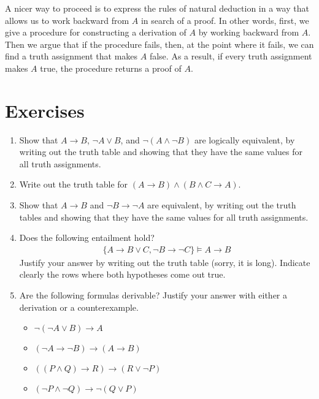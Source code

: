 \documentclass[letterpaper,10pt,english]{sphinxmanual}
\begin{document}
\sphinxAtStartPar
A nicer way to proceed is to express the rules of natural deduction in a way that allows us to work backward from \(A\) in search of a proof. In other words, first, we give a procedure for constructing a derivation of \(A\) by working backward from \(A\). Then we argue that if the procedure fails, then, at the point where it fails, we can find a truth assignment that makes \(A\) false. As a result, if every truth assignment makes \(A\) true, the procedure returns a proof of \(A\).


\section{Exercises}
\label{\detokenize{semantics_of_propositional_logic:exercises}}\begin{enumerate}
%
\item {} 
\sphinxAtStartPar
Show that \(A \to B\), \(\neg A \vee B\), and \(\neg (A \wedge \neg B)\) are logically equivalent, by writing out the truth table and showing that they have the same values for all truth assignments.

\item {} 
\sphinxAtStartPar
Write out the truth table for \((A \to B) \wedge (B \wedge C \to A)\).

\item {} 
\sphinxAtStartPar
Show that \(A \to B\) and \(\neg B \to \neg A\) are equivalent, by writing out the truth tables and showing that they
have the same values for all truth assignments.

\item {} 
\sphinxAtStartPar
Does the following entailment hold?
\begin{equation*}
\begin{split}\{ A \to B \vee C, \neg B \to \neg C \} \models A \to B\end{split}
\end{equation*}
\sphinxAtStartPar
Justify your answer by writing out the truth table (sorry, it is long). Indicate clearly the rows where both hypotheses come out true.

\item {} 
\sphinxAtStartPar
Are the following formulas derivable? Justify your answer with either a derivation or a counterexample.
\begin{itemize}
\item {} 
\sphinxAtStartPar
\(\neg (\neg A \vee B) \to A\)

\item {} 
\sphinxAtStartPar
\((\neg A \to \neg B) \to (A \to B)\)

\item {} 
\sphinxAtStartPar
\(((P \wedge Q) \to R) \to (R \vee \neg P)\)

\item {} 
\sphinxAtStartPar
\((\neg P \wedge \neg Q) \to \neg (Q \vee P)\)

\end{itemize}

\end{enumerate}
\end{document}
